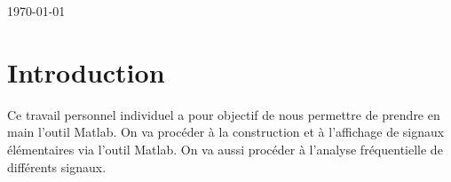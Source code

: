 \begin{titlepage}
\begin{center}
            \vspace*{1\baselineskip}
            \today \\[0.7cm]
        \end{center}
    \end{titlepage}
    \tableofcontents
    \clearpage



    
    
    
    
    
    
\section{Introduction}
Ce travail personnel individuel a pour objectif de nous permettre de prendre en main l'outil Matlab. On va procéder à  la construction et à l'affichage de signaux élémentaires via l'outil Matlab. On va aussi procéder à l'analyse fréquentielle de différents signaux.

